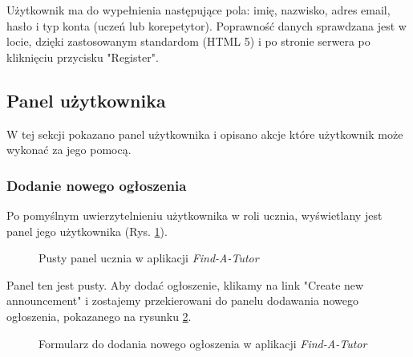 \documentclass[12pt]{article}
\numberwithin{figure}{section}
\begin{document}
\begin{sloppypar}
Użytkownik ma do wypełnienia następujące pola: imię, nazwisko, adres email, hasło i typ konta (uczeń lub korepetytor). Poprawność danych sprawdzana jest w locie, dzięki zastosowanym standardom (HTML 5) i po stronie serwera po kliknięciu przycisku "Register".

\subsection{Panel użytkownika}
W tej sekcji pokazano panel użytkownika i opisano akcje które użytkownik może wykonać za jego pomocą.

\subsubsection{Dodanie nowego ogłoszenia}
Po pomyślnym uwierzytelnieniu użytkownika w roli ucznia, wyświetlany jest panel jego użytkownika (Rys. \ref{fig:student-empty}).

\begin{figure}[!htbp] 
    \centering
    \caption{Pusty panel ucznia w aplikacji \textit{Find-A-Tutor}}
    \label{fig:student-empty}
\end{figure}

Panel ten jest pusty. Aby dodać ogłoszenie, klikamy na link "Create new announcement" i zostajemy przekierowani do panelu dodawania nowego ogłoszenia, pokazanego na rysunku \ref{fig:create-new}.
\begin{figure}[!htbp] 
    \centering
    \caption{Formularz do dodania nowego ogłoszenia w aplikacji \textit{Find-A-Tutor}}
    \label{fig:create-new}
\end{figure}


\end{sloppypar}
\end{document}
